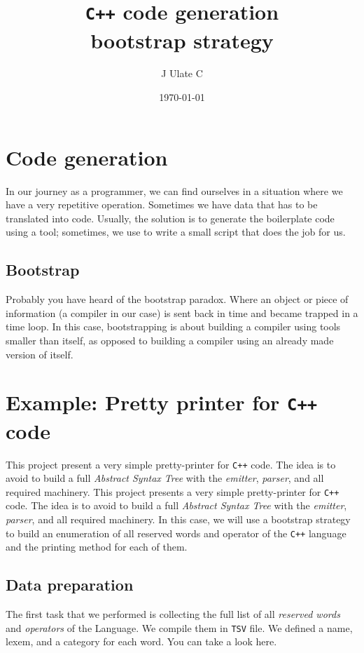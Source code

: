 \documentclass{article}
\title{\texttt{C++} code generation \\
{\small bootstrap strategy}}
\author{J Ulate C}
\date{\today}
\begin{document}
\maketitle

\section{Code generation}

In our journey as a programmer, we can find ourselves in a situation where we have a very repetitive operation. Sometimes we have data that has to be translated into code. Usually, the solution is to generate the boilerplate code using a tool; sometimes, we use to write a small script that does the job for us.

\subsection{Bootstrap}

Probably you have heard of the bootstrap paradox. Where an object or piece of information (a compiler in our case) is sent back in time and became trapped in a time loop. In this case, bootstrapping is about building a compiler using tools smaller than itself, as opposed to building a compiler using an already made version of itself.

\section{Example: Pretty printer for \texttt{C++} code}

This project present a very simple pretty-printer for \texttt{C++} code. The idea is to avoid to build a full \textit{Abstract Syntax Tree} with the \textit{emitter}, \textit{parser}, and all required machinery. This project presents a very simple pretty-printer for \texttt{C++} code. The idea is to avoid to build a full \textit{Abstract Syntax Tree} with the \textit{emitter}, \textit{parser}, and all required machinery. In this case, we will use a bootstrap strategy to build an enumeration of all reserved words and operator of the \texttt{C++} language and the printing method for each of them.

\subsection{Data preparation}

The first task that we performed is collecting the full list of all \textit{reserved words} and \textit{operators} of the Language. We compile them in \texttt{TSV} file. We defined a name, lexem, and a category for each word. You can take a look here.
\end{document}
